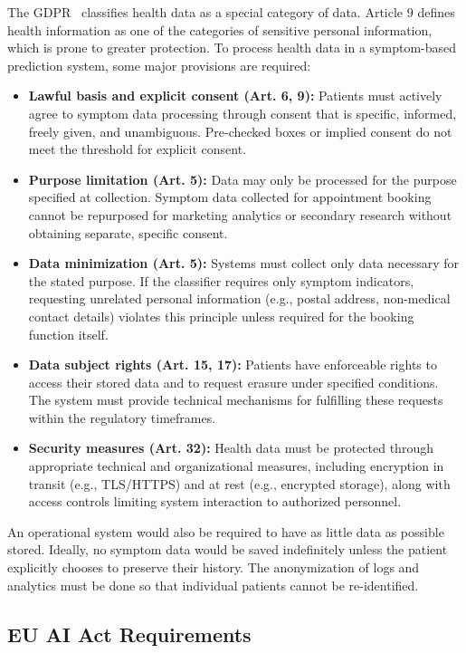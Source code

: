 The GDPR~\citep{GDPR2016} classifies health data as a special category of data. Article 9 defines health information as one of the categories of sensitive personal information, which is prone to greater protection. To process health data in a symptom-based prediction system, some major provisions are required:

\begin{itemize}
    \item \textbf{Lawful basis and explicit consent (Art. 6, 9):} Patients must actively agree to symptom data processing through consent that is specific, informed, freely given, and unambiguous. Pre-checked boxes or implied consent do not meet the threshold for explicit consent.
    \item \textbf{Purpose limitation (Art. 5):} Data may only be processed for the purpose specified at collection. Symptom data collected for appointment booking cannot be repurposed for marketing analytics or secondary research without obtaining separate, specific consent.
    \item \textbf{Data minimization (Art. 5):} Systems must collect only data necessary for the stated purpose. If the classifier requires only symptom indicators, requesting unrelated personal information (e.g., postal address, non-medical contact details) violates this principle unless required for the booking function itself.
    \item \textbf{Data subject rights (Art. 15, 17):} Patients have enforceable rights to access their stored data and to request erasure under specified conditions. The system must provide technical mechanisms for fulfilling these requests within the regulatory timeframes.
    \item \textbf{Security measures (Art. 32):} Health data must be protected through appropriate technical and organizational measures, including encryption in transit (e.g., TLS/HTTPS) and at rest (e.g., encrypted storage), along with access controls limiting system interaction to authorized personnel.
\end{itemize}

An operational system would also be required to have as little data as possible stored. Ideally, no symptom data would be saved indefinitely unless the patient explicitly chooses to preserve their history. The anonymization of logs and analytics must be done so that individual patients cannot be re-identified.

\subsection{EU AI Act Requirements}

